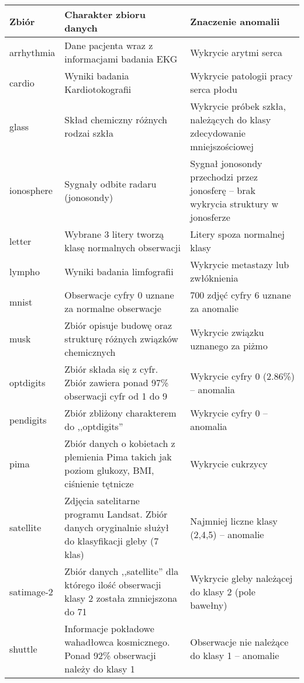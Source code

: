 \begin{table}[h]
    \centering
\begin{tabularx}{\textwidth}{lXX}
\toprule
      Zbiór & Charakter zbioru danych  &  Znaczenie anomalii  \\ \hline
\midrule
arrhythmia &     Dane pacjenta wraz z informacjami badania EKG & Wykrycie arytmi serca \\
    cardio &    Wyniki badania Kardiotokografii   &  Wykrycie patologii pracy serca płodu      \\
     glass &       Skład chemiczny różnych rodzai szkła  & Wykrycie próbek szkła, należących do klasy zdecydowanie mniejszościowej  \\
ionosphere & Sygnały odbite radaru (jonosondy)  &  Sygnał jonosondy przechodzi przez jonosferę -- brak wykrycia struktury w jonosferze    \\   
    letter & Wybrane 3 litery tworzą klasę normalnych obserwacji &  Litery spoza normalnej klasy  \\    
    lympho &  Wyniki badania limfografii  &  Wykrycie metastazy lub zwłóknienia   \\
     mnist &  Obserwacje cyfry 0 uznane za normalne obserwacje  & 700 zdjęć cyfry 6 uznane za anomalie  \\
      musk & Zbiór opisuje budowę oraz strukturę różnych związków chemicznych & Wykrycie związku uznanego za piżmo \\
 optdigits &  Zbiór składa się z cyfr. Zbiór zawiera ponad 97\% obserwacji cyfr od 1 do 9 &            Wykrycie cyfry 0 (2.86\%) -- anomalia \\
 pendigits & Zbiór zbliżony charakterem do ,,optdigits'' &  Wykrycie cyfry 0 -- anomalia     \\
      pima & Zbiór danych o kobietach z plemienia Pima takich jak poziom glukozy, BMI, ciśnienie tętnicze &      Wykrycie cukrzycy        \\
 satellite & Zdjęcia satelitarne programu Landsat. Zbiór danych oryginalnie służył do klasyfikacji gleby (7 klas)   &   Najmniej liczne klasy (2,4,5) -- anomalie      \\
satimage-2 &  Zbiór danych ,,satellite'' dla którego ilość obserwacji klasy 2 została zmniejszona do 71 &   Wykrycie gleby należącej do klasy 2 (pole bawełny)       \\
   shuttle & Informacje pokładowe wahadłowca kosmicznego. Ponad 92\% obserwacji należy do klasy 1 &    Obserwacje nie należące do klasy 1 -- anomalie        \\

\end{tabularx}
\end{table}
